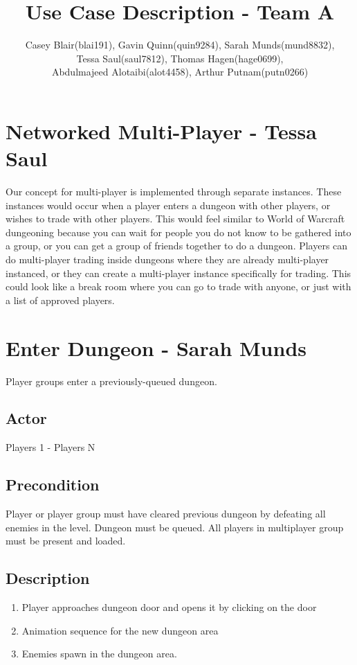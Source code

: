 \documentclass[11pt]{article}
\title{Use Case Description - Team A}
\author{Casey Blair(blai191), Gavin Quinn(quin9284), Sarah Munds(mund8832), \\Tessa Saul(saul7812), Thomas Hagen(hage0699), \\Abdulmajeed Alotaibi(alot4458), Arthur Putnam(putn0266)}
\begin{document}
    \maketitle


   \section{Networked Multi-Player - Tessa Saul }
    Our concept for multi-player is implemented through separate instances. 
    These instances would occur when a player enters a dungeon with other players,
    or wishes to trade with other players. This would feel similar to World of
    Warcraft dungeoning because you can wait for people you do not know to be 
    gathered into a group, or you can get a group of friends together to do a 
    dungeon. Players can do multi-player trading inside dungeons where they 
    are already multi-player instanced, or they can create a multi-player 
    instance specifically for trading. This could look like a break room
    where you can go to trade with anyone, or just with a list of approved players. 

    \section{Enter Dungeon - Sarah Munds}
	Player groups enter a previously-queued dungeon. 

		\subsection{Actor}
		Players 1 - Players N

		\subsection{Precondition}
 		Player or player group must have cleared previous dungeon by defeating all enemies in the level. Dungeon must be queued. All players in multiplayer group must be present and loaded. 

		\subsection{Description}
			\begin{enumerate}
			\item Player approaches dungeon door and opens it by clicking on the door
			\item Animation sequence for the new dungeon area
			\item Enemies spawn in the dungeon area.
			\end{enumerate}
\end{document}
